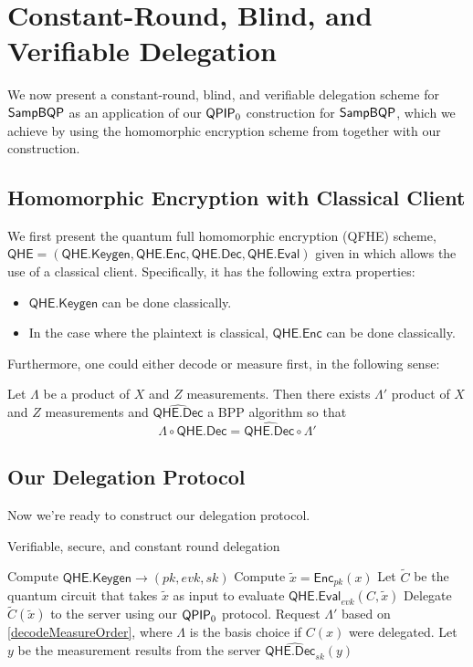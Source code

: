 \section{Constant-Round, Blind, and Verifiable Delegation}

We now present a constant-round, blind, and verifiable delegation scheme for $\operatorname{\mathsf{SampBQP}}$ as an application of our $\operatorname{\mathsf{QPIP}}_0$ construction for $\operatorname{\mathsf{SampBQP}}$,
which we achieve by using the homomorphic encryption scheme from \cite{mahadev_qfhe} together with our construction.

\subsection{Homomorphic Encryption with Classical Client}

We first present the quantum full homomorphic encryption (QFHE) scheme, $\mathsf{QHE}=(\mathsf{QHE.Keygen}, \mathsf{QHE.Enc}, \mathsf{QHE.Dec}, \mathsf{QHE.Eval})$ given in \cite{mahadev_qfhe} which allows the use of a classical client. Specifically, it has the following extra properties:
\begin{itemize}
	\item $\mathsf{QHE.Keygen}$ can be done classically.
	\item In the case where the plaintext is classical, $\mathsf{QHE.Enc}$ can be done classically.
\end{itemize}

Furthermore, one could either decode or measure first, in the following sense:
\begin{lemma}
	\label{decodeMeasureOrder}
	Let $\Lambda$ be a product of $X$ and $Z$ measurements. Then there exists $\Lambda'$ product of $X$ and $Z$ measurements and $\widehat{\mathsf{QHE.Dec}}$ a BPP algorithm so that
		$$\Lambda\circ\mathsf{QHE.Dec}=\widehat{\mathsf{QHE.Dec}}\circ\Lambda'$$
\end{lemma}

\subsection{Our Delegation Protocol}

Now we're ready to construct our delegation protocol.

\begin{algorithm}
	\caption{Verifiable, secure, and constant round delegation}
	\label{ProtoPriv}
	\begin{algorithmic}[1]
			\State Compute $\mathsf{QHE.Keygen}\rightarrow(pk, evk, sk)$
			\State Compute $\tilde{x}=\mathsf{Enc}_{pk}(x)$
			\State Let $\tilde{C}$ be the quantum circuit that takes $\tilde{x}$ as input to evaluate $\mathsf{QHE.Eval}_{evk}(C, \tilde{x})$
			\State Delegate $\tilde{C}(\tilde{x})$ to the server using our $\operatorname{\mathsf{QPIP}}_0$ protocol.
			\State Request $\Lambda'$ based on \autoref{decodeMeasureOrder}, where $\Lambda$ is the basis choice if $C(x)$ were delegated.
			\State Let $y$ be the measurement results from the server
			\State \Return $\widehat{\mathsf{QHE.Dec}_{sk}}(y)$
		\EndProcedure
	\end{algorithmic}
\end{algorithm}

